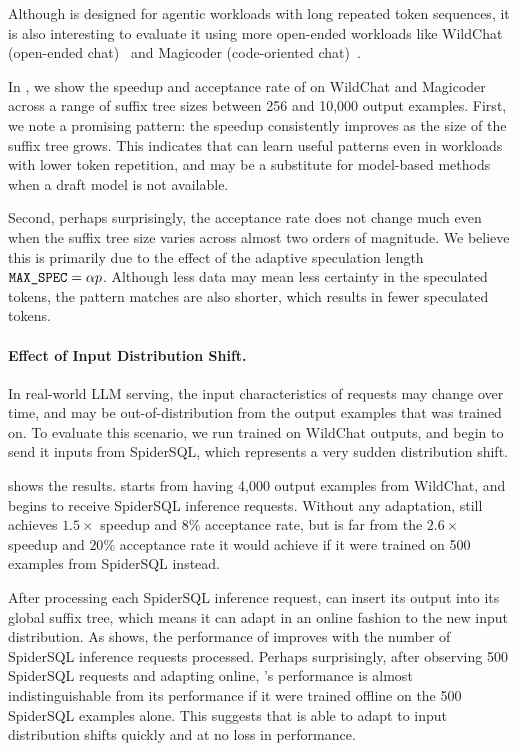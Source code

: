Although \SuffixDecoding is designed for agentic workloads with long repeated token sequences, it is also interesting to evaluate it using more open-ended workloads like WildChat (open-ended chat)~\citep{zhao2024wildchat} and Magicoder (code-oriented chat)~\citep{wei2023magicoder}.

In , we show the speedup and acceptance rate of \SuffixDecoding on WildChat and Magicoder across a range of suffix tree sizes between 256 and 10,000 output examples. First, we note a promising pattern: the speedup consistently improves as the size of the suffix tree grows. This indicates that \SuffixDecoding can learn useful patterns even in workloads with lower token repetition, and may be a substitute for model-based methods when a draft model is not available.

Second, perhaps surprisingly, the acceptance rate does not change much even when the suffix tree size varies across almost two orders of magnitude. We believe this is primarily due to the effect of the adaptive speculation length \( \texttt{MAX\_SPEC} = \alpha p \). Although less data may mean less certainty in the speculated tokens, the pattern matches are also shorter, which results in fewer speculated tokens.

\paragraph{Effect of Input Distribution Shift.}

In real-world LLM serving, the input characteristics of requests may change over time, and may be out-of-distribution from the output examples that \SuffixDecoding was trained on. To evaluate this scenario, we run \SuffixDecoding trained on WildChat outputs, and begin to send it inputs from SpiderSQL, which represents a very sudden distribution shift.

 shows the results. \SuffixDecoding starts from having 4,000 output examples from WildChat, and begins to receive SpiderSQL inference requests. Without any adaptation, \SuffixDecoding still achieves \( 1.5\times \) speedup and \( 8\% \) acceptance rate, but is far from the \( 2.6\times \) speedup and \( 20\% \) acceptance rate it would achieve if it were trained on 500 examples from SpiderSQL instead.

After processing each SpiderSQL inference request, \SuffixDecoding can insert its output into its global suffix tree, which means it can adapt in an online fashion to the new input distribution. As  shows, the performance of \SuffixDecoding improves with the number of SpiderSQL inference requests processed. Perhaps surprisingly, after observing 500 SpiderSQL requests and adapting online, \SuffixDecoding's performance is almost indistinguishable from its performance if it were trained offline on the 500 SpiderSQL examples alone. This suggests that \SuffixDecoding is able to adapt to input distribution shifts quickly and at no loss in performance.

